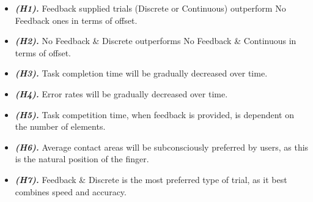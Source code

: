 \begin{itemize}
	\item \textbf{\textit{(H1).}} Feedback supplied trials (Discrete or Continuous) outperform No Feedback ones in terms of offset.
	\item \textbf{\textit{(H2).}} No Feedback \& Discrete outperforms No Feedback \& Continuous in terms of offset.
	\item \textbf{\textit{(H3).}} Task completion time will be gradually decreased over time.
	\item \textbf{\textit{(H4).}} Error rates will be gradually decreased over time.
	\item \textbf{\textit{(H5).}} Task competition time, when feedback is provided, is dependent on the number of elements.
	\item \textbf{\textit{(H6).}} Average contact areas will be subconsciously preferred by users, as this is the natural position of the finger.
	\item \textbf{\textit{(H7).}} Feedback \& Discrete is the most preferred type of trial, as it best combines speed and accuracy.
\end{itemize}




